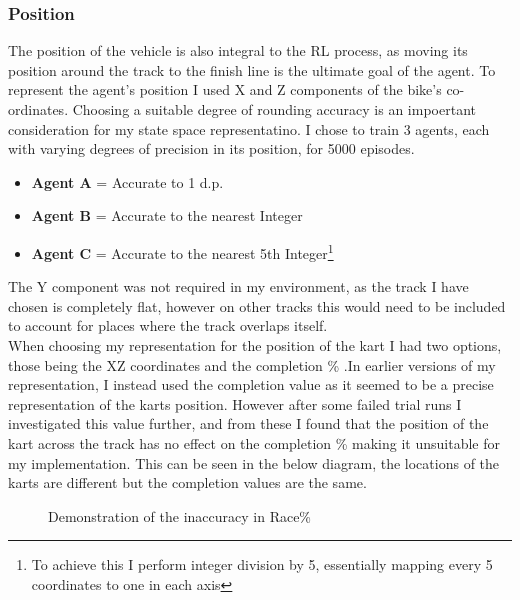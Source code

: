 \subsubsection{Position}
The position of the vehicle is also integral to the RL process, as moving its position around the track to the finish line is the ultimate goal of the agent. To represent the agent's position I used X and Z components of the bike's co-ordinates.  Choosing a suitable degree of rounding accuracy is an impoertant consideration for my state space representatino. I chose to train 3 agents, each with varying degrees of precision in its position, for 5000 episodes.
\begin{itemize}
    \item \textbf{Agent A} = Accurate to 1 d.p.
    \item \textbf{Agent B} = Accurate to the nearest Integer
    \item \textbf{Agent C} = Accurate to the nearest 5th Integer\footnote{To achieve this I perform integer division by 5, essentially mapping every 5 coordinates to one in each axis}
\end{itemize}
The Y component was not required in my environment, as the track I have chosen is completely flat, however on other tracks this would need to be included to account for places where the track overlaps itself.\\When choosing my representation for the position of the kart I had two options, those being the XZ coordinates and the completion \% .In earlier versions of my representation, I instead used the completion value as it seemed to be a precise representation of the karts position. However after some failed trial runs I investigated this value further, and from these I found that the position of the kart across the track has no effect on the completion \% making it unsuitable for my implementation. This can be seen in the below diagram, the locations of the karts are different but the completion values are the same.
\begin{figure}[ht]
    \centering
    \hfill
    \caption{Demonstration of the inaccuracy in Race\%}
\end{figure}
